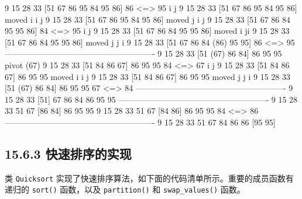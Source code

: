 \begin{codebox}
   9   15   28   33  [51   67   86   95   84   95   86]  86 <=> 95
                                 i              j      
   9   15   28   33  [51   67   86   95   84   95   86]  moved i
                                      i         j      
   9   15   28   33  [51   67   86   95   84   95   86]  moved j
                                      i    j           
   9   15   28   33  [51   67   86   84   95   95   86]  84 <=> 95
                                      i    j           
   9   15   28   33  [51   67   86   84   95   95   86]  moved i
                                          ji           
   9   15   28   33  [51   67   86   84   95   95   86]  moved j
                                      j    i           
   9   15   28   33  [51   67   86   84  (86)  95   95]  86 <=> 95
-------------------------------------------------------
   9   15   28   33  [51  (67)  86   84]  86   95   95   pivot (67)
   9   15   28   33  [51   84   86   67]  86   95   95   84 <=> 67
                       i         j                     
   9   15   28   33  [51   84   86   67]  86   95   95   moved i
                            i         j                
   9   15   28   33  [51   84   86   67]  86   95   95   moved j
                       j    i                          
   9   15   28   33  [51  (67)  86   84]  86   95   95   67 <=> 84
-------------------------------------------------------
   9   15   28   33  [51]  67   86   84   86   95   95 
-------------------------------------------------------
   9   15   28   33   51   67  [86   84]  86   95   95 
   9   15   28   33   51   67  [84   86]  86   95   95   84 <=> 86
-------------------------------------------------------
   9   15   28   33   51   67   84   86   86  [95   95]
\end{codebox}

\subsection{15.6.3 快速排序的实现}

类 \texttt{Quicksort} 实现了快速排序算法，如下面的代码清单所示。重要的成员函数有递归的 \texttt{sort()} 函数，以及 \texttt{partition(\allowbreak{})\allowbreak{}} 和 \texttt{swap\_\allowbreak{}values(\allowbreak{})\allowbreak{}} 函数。

